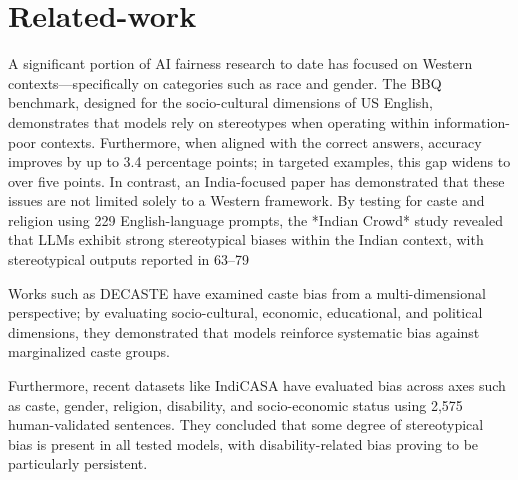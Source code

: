 \documentclass[sigplan,screen]{acmart}
\begin{document}
\section{Related-work}
A significant portion of AI fairness research to date has focused on Western contexts—specifically on categories such as race and gender. The BBQ benchmark, designed for the socio-cultural dimensions of US English, demonstrates that models rely on stereotypes when operating within information-poor contexts. Furthermore, when aligned with the correct answers, accuracy improves by up to 3.4 percentage points; in targeted examples, this gap widens to over five points. In contrast, an India-focused paper has demonstrated that these issues are not limited solely to a Western framework. By testing for caste and religion using 229 English-language prompts, the *Indian Crowd* study revealed that LLMs exhibit strong stereotypical biases within the Indian context, with stereotypical outputs reported in 63–79%

Works such as DECASTE have examined caste bias from a multi-dimensional perspective; by evaluating socio-cultural, economic, educational, and political dimensions, they demonstrated that models reinforce systematic bias against marginalized caste groups.

Furthermore, recent datasets like IndiCASA have evaluated bias across axes such as caste, gender, religion, disability, and socio-economic status using 2,575 human-validated sentences. They concluded that some degree of stereotypical bias is present in all tested models, with disability-related bias proving to be particularly persistent.
\end{document}
